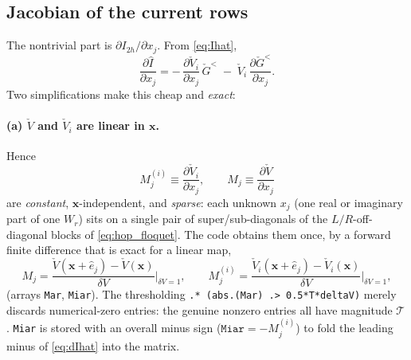 \documentclass[11pt,a4paper]{article}
\begin{document}
\subsection{Jacobian of the current rows}

The nontrivial part is $\partial I_{2h}/\partial x_j$.  From \eqref{eq:Ihat},
\begin{equation}
  \frac{\partial \hat I}{\partial x_j}
  = -\,\frac{\partial \check V_i}{\partial x_j}\,\check G^<
    \;-\;\check V_i\,\frac{\partial \check G^<}{\partial x_j}.
  \label{eq:dIhat}
\end{equation}
Two simplifications make this cheap and \emph{exact}:

\paragraph{(a) $\check V$ and $\check V_i$ are linear in $\mathbf x$.}
Hence
\begin{equation}
  M^{(i)}_j \equiv \frac{\partial \check V_i}{\partial x_j},
  \qquad
  M_j \equiv \frac{\partial \check V}{\partial x_j}
  \label{eq:Mdef}
\end{equation}
are \emph{constant}, $\mathbf x$-independent, and \emph{sparse}: each unknown
$x_j$ (one real or imaginary part of one $W_r$) sits on a single pair of
super/sub-diagonals of the $L/R$-off-diagonal blocks of \eqref{eq:hop_floquet}.
The code obtains them once, by a forward finite difference that is exact for a
linear map,
\begin{equation}
  M_j = \frac{\check V(\mathbf x+\hat e_j)-\check V(\mathbf x)}{\delta V}\Big|_{\delta V=1},
  \qquad
  M^{(i)}_j = \frac{\check V_i(\mathbf x+\hat e_j)-\check V_i(\mathbf x)}{\delta V}\Big|_{\delta V=1},
\end{equation}
(arrays \texttt{Mar}, \texttt{Miar}).  The thresholding
\verb|.* (abs.(Mar) .> 0.5*T*deltaV)| merely discards numerical-zero entries: the
genuine nonzero entries all have magnitude $\mathcal T$.  \texttt{Miar} is stored
with an overall minus sign ($\texttt{Miar}=-M^{(i)}_j$) to fold the leading minus
of \eqref{eq:dIhat} into the matrix.
\end{document}
